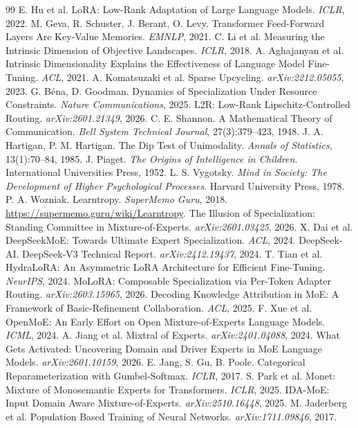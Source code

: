 \documentclass{article}
\begin{document}
\begin{thebibliography}{99}
 E. Hu et al. LoRA: Low-Rank Adaptation of Large Language Models. \textit{ICLR}, 2022.
 M. Geva, R. Schuster, J. Berant, O. Levy. Transformer Feed-Forward Layers Are Key-Value Memories. \textit{EMNLP}, 2021.
 C. Li et al. Measuring the Intrinsic Dimension of Objective Landscapes. \textit{ICLR}, 2018.
 A. Aghajanyan et al. Intrinsic Dimensionality Explains the Effectiveness of Language Model Fine-Tuning. \textit{ACL}, 2021.
 A. Komatsuzaki et al. Sparse Upcycling. \textit{arXiv:2212.05055}, 2023.
 G. B\'{e}na, D. Goodman. Dynamics of Specialization Under Resource Constraints. \textit{Nature Communications}, 2025.
 L2R: Low-Rank Lipschitz-Controlled Routing. \textit{arXiv:2601.21349}, 2026.
 C. E. Shannon. A Mathematical Theory of Communication. \textit{Bell System Technical Journal}, 27(3):379--423, 1948.
 J. A. Hartigan, P. M. Hartigan. The Dip Test of Unimodality. \textit{Annals of Statistics}, 13(1):70--84, 1985.
 J. Piaget. \textit{The Origins of Intelligence in Children}. International Universities Press, 1952.
 L. S. Vygotsky. \textit{Mind in Society: The Development of Higher Psychological Processes}. Harvard University Press, 1978.
 P. A. Wozniak. Learntropy. \textit{SuperMemo Guru}, 2018. \url{https://supermemo.guru/wiki/Learntropy}.
 The Illusion of Specialization: Standing Committee in Mixture-of-Experts. \textit{arXiv:2601.03425}, 2026.
 X. Dai et al. DeepSeekMoE: Towards Ultimate Expert Specialization. \textit{ACL}, 2024.
 DeepSeek-AI. DeepSeek-V3 Technical Report. \textit{arXiv:2412.19437}, 2024.
 T. Tian et al. HydraLoRA: An Asymmetric LoRA Architecture for Efficient Fine-Tuning. \textit{NeurIPS}, 2024.
 MoLoRA: Composable Specialization via Per-Token Adapter Routing. \textit{arXiv:2603.15965}, 2026.
 Decoding Knowledge Attribution in MoE: A Framework of Basic-Refinement Collaboration. \textit{ACL}, 2025.
 F. Xue et al. OpenMoE: An Early Effort on Open Mixture-of-Experts Language Models. \textit{ICML}, 2024.
 A. Jiang et al. Mixtral of Experts. \textit{arXiv:2401.04088}, 2024.
 What Gets Activated: Uncovering Domain and Driver Experts in MoE Language Models. \textit{arXiv:2601.10159}, 2026.
 E. Jang, S. Gu, B. Poole. Categorical Reparameterization with Gumbel-Softmax. \textit{ICLR}, 2017.
 S. Park et al. Monet: Mixture of Monosemantic Experts for Transformers. \textit{ICLR}, 2025.
 IDA-MoE: Input Domain Aware Mixture-of-Experts. \textit{arXiv:2510.16448}, 2025.
 M. Jaderberg et al. Population Based Training of Neural Networks. \textit{arXiv:1711.09846}, 2017.
\end{thebibliography}
\end{document}
